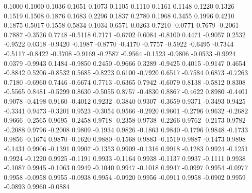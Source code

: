     0.1000    0.1000
    0.1036    0.1051
    0.1073    0.1105
    0.1110    0.1161
    0.1148    0.1220
    0.1326    0.1519
    0.1508    0.1876
    0.1683    0.2296
    0.1837    0.2780
    0.1968    0.3455
    0.1996    0.4210
    0.1875    0.5017
    0.1558    0.5834
    0.1034    0.6571
    0.0263    0.7210
   -0.0771    0.7679
   -0.2061    0.7887
   -0.3526    0.7748
   -0.5118    0.7171
   -0.6702    0.6084
   -0.8100    0.4471
   -0.9057    0.2532
   -0.9522    0.0318
   -0.9420   -0.1987
   -0.8770   -0.4170
   -0.7757   -0.5922
   -0.6495   -0.7344
   -0.5117   -0.8422
   -0.3708   -0.9169
   -0.2587   -0.9564
   -0.1523   -0.9806
   -0.0533   -0.9924
    0.0379   -0.9943
    0.1484   -0.9850
    0.2450   -0.9666
    0.3289   -0.9425
    0.4015   -0.9147
    0.4654   -0.8842
    0.5206   -0.8532
    0.5685   -0.8223
    0.6100   -0.7920
    0.6517   -0.7584
    0.6873   -0.7263
    0.7180   -0.6960
    0.7446   -0.6674
    0.7713   -0.6365
    0.7942   -0.6079
    0.8138   -0.5812
    0.8308   -0.5565
    0.8481   -0.5299
    0.8630   -0.5055
    0.8757   -0.4830
    0.8867   -0.4622
    0.8980   -0.4401
    0.9078   -0.4198
    0.9160   -0.4012
    0.9232   -0.3840
    0.9307   -0.3659
    0.9371   -0.3493
    0.9425   -0.3341
    0.9473   -0.3201
    0.9523   -0.3054
    0.9566   -0.2920
    0.9601   -0.2796
    0.9632   -0.2682
    0.9666   -0.2565
    0.9695   -0.2458
    0.9718   -0.2358
    0.9738   -0.2266
    0.9762   -0.2173
    0.9782   -0.2088
    0.9796   -0.2008
    0.9809   -0.1934
    0.9826   -0.1863
    0.9840   -0.1796
    0.9848   -0.1733
    0.9856   -0.1674
    0.9870   -0.1620
    0.9880   -0.1568
    0.9883   -0.1519
    0.9887   -0.1473
    0.9898   -0.1431
    0.9906   -0.1391
    0.9907   -0.1353
    0.9909   -0.1316
    0.9918   -0.1283
    0.9924   -0.1251
    0.9924   -0.1220
    0.9925   -0.1191
    0.9933   -0.1164
    0.9938   -0.1137
    0.9937   -0.1111
    0.9938   -0.1087
    0.9945   -0.1063
    0.9949   -0.1040
    0.9947   -0.1018
    0.9947   -0.0997
    0.9954   -0.0977
    0.9958   -0.0958
    0.9955   -0.0938
    0.9954   -0.0920
    0.9956   -0.0911
    0.9958   -0.0902
    0.9959   -0.0893
    0.9960   -0.0884